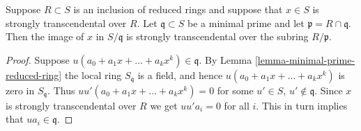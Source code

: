 \begin{lemma}
\label{lemma-reduced-strongly-transcendental-minimal-prime}
Suppose $R \subset S$ is an inclusion of reduced rings
and suppose that $x \in S$ is strongly transcendental over $R$.
Let $\mathfrak q \subset S$ be a minimal prime
and let $\mathfrak p = R \cap \mathfrak q$.
Then the image of $x$ in $S/\mathfrak q$ is strongly
transcendental over the subring $R/\mathfrak p$.
\end{lemma}

\begin{proof}
Suppose $u(a_0 + a_1x + \ldots + a_k x^k) \in \mathfrak q$.
By Lemma \ref{lemma-minimal-prime-reduced-ring}
the local ring $S_{\mathfrak q}$ is a field,
and hence $u(a_0 + a_1x + \ldots + a_k x^k) $ is zero
in $S_{\mathfrak q}$. Thus $uu'(a_0 + a_1x + \ldots + a_k x^k) = 0$
for some $u' \in S$, $u' \not\in \mathfrak q$.
Since $x$ is strongly transcendental over $R$ we get
$uu'a_i = 0$ for all $i$. This in turn implies
that $ua_i \in \mathfrak q$.
\end{proof}
